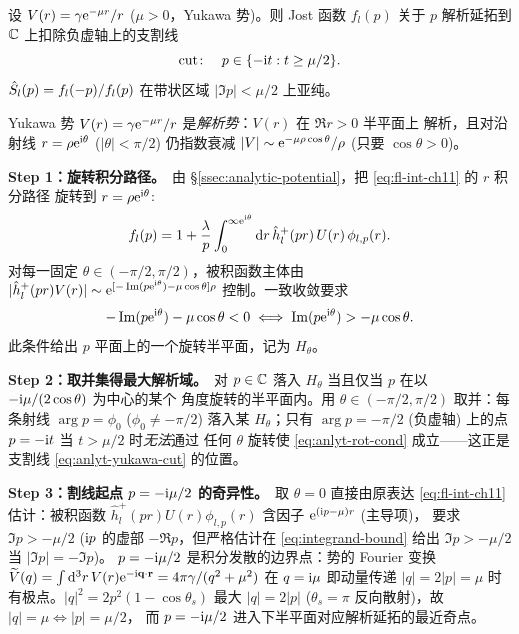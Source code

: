 \begin{theorem*}
设 $V(r)=\gamma\mathrm{e}^{-\mu r}/r$ ($\mu>0$，Yukawa 势)。则 Jost 函数 $f_l(p)$
关于 $p$ 解析延拓到 $\mathbb{C}$ 上扣除负虚轴上的支割线
\begin{equation}
\mathrm{cut}\colon\quad p\in\{-\mathrm{i} t : t\geq \mu/2\}.
\label{eq:anlyt-yukawa-cut}
\end{equation}
$\hat{S}_l(p)=f_l(-p)/f_l(p)$ 在带状区域 $|\Im p|<\mu/2$ 上亚纯。
\end{theorem*}

\begin{proof*}
Yukawa 势 $V(r)=\gamma\mathrm{e}^{-\mu r}/r$ 是\emph{解析势}：$V(r)$ 在 $\Re r>0$ 半平面上
解析，且对沿射线 $r=\rho\mathrm{e}^{\mathrm{i}\theta}$ ($|\theta|<\pi/2$) 仍指数衰减
$|V|\sim \mathrm{e}^{-\mu\rho\cos\theta}/\rho$ (只要 $\cos\theta>0$)。

\textbf{Step 1：旋转积分路径。}\,
由 \S\ref{ssec:analytic-potential}，把 \eqref{eq:fl-int-ch11} 的 $r$ 积分路径
旋转到 $r=\rho\mathrm{e}^{\mathrm{i}\theta}$:
\begin{equation}
f_l(p)=1+\frac{\lambda}{p}\int_0^{\infty\mathrm{e}^{\mathrm{i}\theta}}\mathrm{d} r\,\hat h^+_l(pr)\,U(r)\,\phi_{l,p}(r).
\label{eq:anlyt-fl-rot}
\end{equation}
对每一固定 $\theta\in(-\pi/2,\pi/2)$，被积函数主体由
$|\hat h^+_l(pr)V(r)|\sim \mathrm{e}^{[-\Im(p\mathrm{e}^{\mathrm{i}\theta})-\mu\cos\theta]\rho}$
控制。一致收敛要求
\begin{equation}
-\Im(p\mathrm{e}^{\mathrm{i}\theta})-\mu\cos\theta < 0\;\Longleftrightarrow\;
\Im(p\mathrm{e}^{\mathrm{i}\theta})>-\mu\cos\theta.
\label{eq:anlyt-rot-cond}
\end{equation}
此条件给出 $p$ 平面上的一个旋转半平面，记为 $H_\theta$。

\textbf{Step 2：取并集得最大解析域。}\,
对 $p\in\mathbb{C}$ 落入 $H_\theta$ 当且仅当 $p$ 在以 $-\mathrm{i}\mu/(2\cos\theta)$ 为中心的某个
角度旋转的半平面内。用 $\theta\in(-\pi/2,\pi/2)$ 取并：每条射线
$\arg p=\phi_0$ ($\phi_0\neq -\pi/2$) 落入某 $H_\theta$；只有
$\arg p=-\pi/2$ (负虚轴) 上的点 $p=-\mathrm{i} t$ 当 $t>\mu/2$ 时\emph{无法}通过
任何 $\theta$ 旋转使 \eqref{eq:anlyt-rot-cond} 成立——这正是支割线
\eqref{eq:anlyt-yukawa-cut} 的位置。

\textbf{Step 3：割线起点 $p=-\mathrm{i}\mu/2$ 的奇异性。}\,
取 $\theta=0$ 直接由原表达 \eqref{eq:fl-int-ch11} 估计：被积函数
$\hat h^+_l(pr)U(r)\phi_{l,p}(r)$ 含因子 $\mathrm{e}^{(\mathrm{i} p-\mu)r}$ (主导项)，
要求 $\Im p>-\mu/2$ ($\mathrm{i} p$ 的虚部 $-\Re p$，但严格估计在
\eqref{eq:integrand-bound} 给出 $\Im p>-\mu/2$ 当 $|\Im p|=-\Im p$)。
$p=-\mathrm{i}\mu/2$ 是积分发散的边界点：势的 Fourier 变换
$\widetilde V(q)=\int\mathrm{d}^3 r\,V(r)\mathrm{e}^{-\mathrm{i}\mathbf q\cdot\mathbf r}=4\pi\gamma/(q^2+\mu^2)$
在 $q=\mathrm{i}\mu$ 即动量传递 $|q|=2|p|=\mu$ 时有极点。$|q|^2=2p^2(1-\cos\theta_s)$
最大 $|q|=2|p|$ ($\theta_s=\pi$ 反向散射)，故 $|q|=\mu\Leftrightarrow|p|=\mu/2$，
而 $p=-\mathrm{i}\mu/2$ 进入下半平面对应解析延拓的最近奇点。


\end{proof*}

